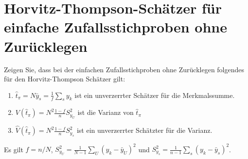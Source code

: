 \documentclass{article}
\begin{document}
\section{Horvitz-Thompson-Schätzer für einfache Zufallsstichproben ohne Zurücklegen}
Zeigen Sie, dass bei der einfachen Zufallsstichproben ohne Zurücklegen folgendes für den Horvitz-Thompson Schätzer gilt:
\begin{enumerate}
	\item $\hat{t}_\pi = N \bar{y}_s = \frac{1}{f}\sum_s y_k$ ist ein unverzerrter Schätzer für die Merkmalssumme.
	\item $V(\hat{t}_\pi) = N^2 \frac{1-f}{n}S_{y_U}^2$ ist die Varianz von $\hat{t}_\pi$
	\item $\hat{V}(\hat{t}_\pi) = N^2 \frac{1-f}{n}S_{y_s}^2$ ist ein unverzerrter Schätzter für die Varianz.
\end{enumerate}
Es gilt $f=n/N$, $S_{y_U}^2=\frac{1}{N-1}\sum_U (y_k - \bar{y}_U)^2 $ und $S_{y_s}^2=\frac{1}{n-1}\sum_s (y_k - \bar{y}_s)^2$.
\end{document}
